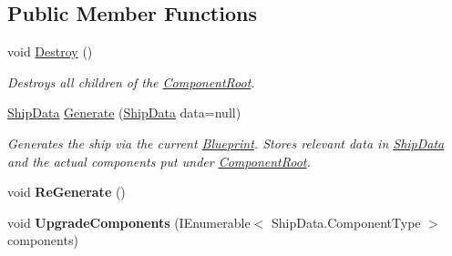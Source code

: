 \subsection*{Public Member Functions}
\begin{DoxyCompactItemize}
\item 
void \hyperlink{class_skyrates_1_1_ship_1_1_ship_generator_a90a28b98dee78c230ad12e75417bc97f}{Destroy} ()
\begin{DoxyCompactList}\small\item\em Destroys all children of the \hyperlink{class_skyrates_1_1_ship_1_1_ship_generator_a040b9432f06173ddce445b14fdd42c9a}{Component\-Root}. \end{DoxyCompactList}\item 
\hyperlink{class_skyrates_1_1_ship_1_1_ship_data}{Ship\-Data} \hyperlink{class_skyrates_1_1_ship_1_1_ship_generator_a98648e2db2bd204cd7a470df9f8745d5}{Generate} (\hyperlink{class_skyrates_1_1_ship_1_1_ship_data}{Ship\-Data} data=null)
\begin{DoxyCompactList}\small\item\em Generates the ship via the current \hyperlink{class_skyrates_1_1_ship_1_1_ship_generator_a97b0d9ba683bd4ea383f01ef96348d5a}{Blueprint}. Stores relevant data in \hyperlink{class_skyrates_1_1_ship_1_1_ship_data}{Ship\-Data} and the actual components put under \hyperlink{class_skyrates_1_1_ship_1_1_ship_generator_a040b9432f06173ddce445b14fdd42c9a}{Component\-Root}. \end{DoxyCompactList}\item 
\hypertarget{class_skyrates_1_1_ship_1_1_ship_generator_aa07941574bf573545893795aa290a66e}{void {\bfseries Re\-Generate} ()}\label{class_skyrates_1_1_ship_1_1_ship_generator_aa07941574bf573545893795aa290a66e}

\item 
\hypertarget{class_skyrates_1_1_ship_1_1_ship_generator_a4d2d00198f103ae79ed9ff267625da03}{void {\bfseries Upgrade\-Components} (I\-Enumerable$<$ Ship\-Data.\-Component\-Type $>$ components)}\label{class_skyrates_1_1_ship_1_1_ship_generator_a4d2d00198f103ae79ed9ff267625da03}

\end{DoxyCompactItemize}
